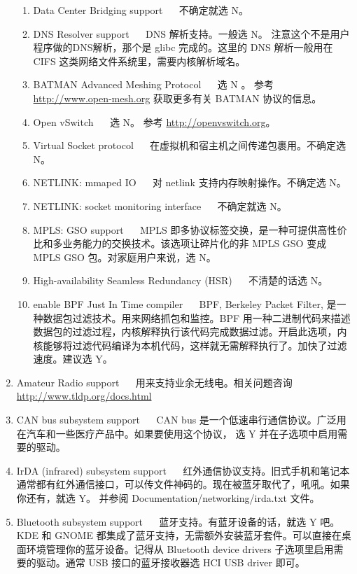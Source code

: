 \begin{enumerate}
\begin{enumerate}
\item Data Center Bridging support ~~ 不确定就选 N。

\item DNS Resolver support ~~ DNS 解析支持。一般选 N。 注意这个不是用户程序做的DNS解析，那个是 glibc 完成的。这里的 DNS 解析一般用在 CIFS 这类网络文件系统里，需要内核解析域名。

\item BATMAN Advanced Meshing Protocol  ~~  选 N 。 
参考  \url{http://www.open-mesh.org} 获取更多有关 BATMAN 协议的信息。

\item Open vSwitch ~~ 选 N。 参考  \url{http://openvswitch.org}。
\item Virtual Socket protocol ~~ 在虚拟机和宿主机之间传递包裹用。不确定选 N。

\item NETLINK: mmaped IO ~~ 对 netlink 支持内存映射操作。不确定选 N。
\item NETLINK: socket monitoring interface ~~ 不确定就选 N。

\item MPLS: GSO support ~~ MPLS 即多协议标签交换，是一种可提供高性价比和多业务能力的交换技术。该选项让碎片化的非 MPLS GSO 变成 MPLS GSO 包。对家庭用户来说，选 N。
\item High-availability Seamless Redundancy (HSR) ~~ 不清楚的话选 N。

\item enable BPF Just In Time compiler ~~ BPF, Berkeley Packet Filter, 是一种数据包过滤技术。用来网络抓包和监控。BPF 用一种二进制代码来描述数据包的过滤过程，内核解释执行该代码完成数据过滤。开启此选项，内核能够将过滤代码编译为本机代码，这样就无需解释执行了。加快了过滤速度。建议选 Y。

\end{enumerate}

\item Amateur Radio support ~~ 用来支持业余无线电。相关问题咨询 \url{http://www.tldp.org/docs.html} 
\item CAN bus subsystem support ~~ CAN bus 是一个低速串行通信协议。广泛用在汽车和一些医疗产品中。如果要使用这个协议， 选 Y 并在子选项中启用需要的驱动。

\item IrDA (infrared) subsystem support ~~ 红外通信协议支持。旧式手机和笔记本通常都有红外通信接口，可以传文件神码的。现在被蓝牙取代了，吼吼。如果你还有，就选 Y。 并参阅 Documentation/networking/irda.txt 文件。

\item Bluetooth subsystem support ~~ 蓝牙支持。有蓝牙设备的话，就选 Y 吧。 KDE 和 GNOME 都集成了蓝牙支持，无需额外安装蓝牙套件。可以直接在桌面环境管理你的蓝牙设备。记得从 Bluetooth device drivers 子选项里启用需要的驱动。通常 USB 接口的蓝牙接收器选 HCI USB driver 即可。


\end{enumerate}
